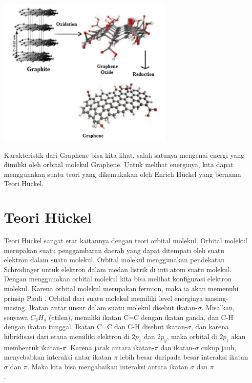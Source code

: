 \documentclass[12pt,a4paper]{report}
\begin{document}
	\begin{center}
		\includegraphics[width=8.75cm]{gambar/oksgraf.png}
	\end{center}
	
	Karakteristik dari Graphene bisa kita lihat, salah satunya mengenai energi yang dimiliki oleh orbital molekul Graphene. Untuk melihat energinya, kita dapat menggunakan suatu teori yang dikemukakan oleh Enrich Hückel yang bernama Teori Hückel. 
	
	\section{Teori Hückel}
	Teori Hückel sangat erat kaitannya dengan teori orbital molekul. Orbital molekul merupakan suatu penggambaran daerah yang dapat ditempati oleh suatu elektron dalam suatu molekul. Orbital molekul menggunakan pendekatan Schrödinger untuk elektron dalam medan listrik di inti atom suatu molekul. Dengan menggunakan orbital molekul kita bisa melihat konfigurasi elektron molekul. Karena orbital molekul merupakan fermion, maka ia akan memenuhi prinsip Pauli \cite{Coton1990}. Orbital dari suatu molekul memiliki level energinya masing-masing. Ikatan antar unsur dalam suatu molekul disebut ikatan-{$\sigma$}. Misalkan, senyawa {$C_2H_4$} (etilen), memiliki ikatan C=C dengan ikatan ganda, dan C-H dengan ikatan tunggal. Ikatan C=C dan C-H disebut ikatan-{$\sigma$}, dan karena hibridisasi dari etana memiliki elektron di {$2p_x$} dan {$2p_y$}, maka orbital di {$2p_z$} akan membentuk ikatan-{$\pi$}. Karena jarak antara ikatan-{$\pi$} dan ikatan-{$\sigma$} cukup jauh, menyebabkan interaksi antar ikatan {$\pi$} lebih besar daripada besar interaksi ikatan {$\sigma$} dan {$\pi$}. Maka kita bisa mengabaikan interaksi antara ikatan {$\sigma$} dan {$\pi$} \cite{Siregar2014}\\.
	
\end{document}
